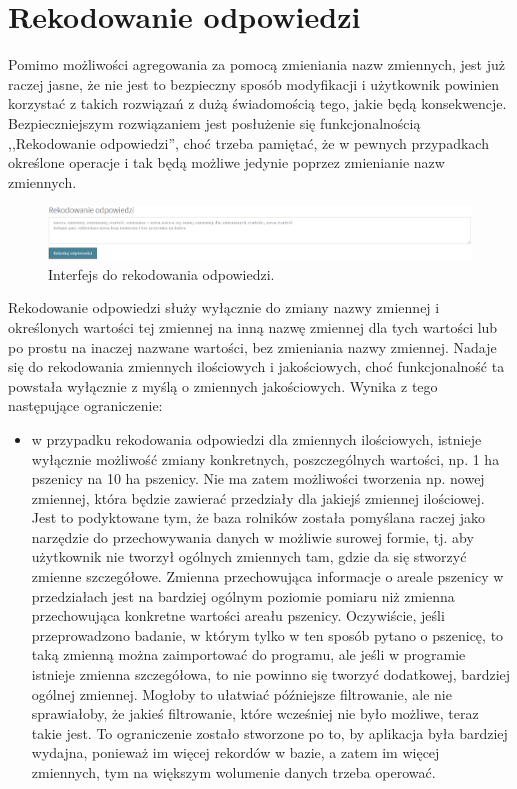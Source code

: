 \documentclass[12pt, twoside, hidelinks]{report}
\begin{document}
\section{Rekodowanie odpowiedzi}
Pomimo możliwości agregowania za pomocą zmieniania nazw zmiennych, jest już raczej jasne, że nie jest to bezpieczny sposób modyfikacji i użytkownik powinien korzystać z takich rozwiązań z dużą świadomością tego, jakie będą konsekwencje. Bezpieczniejszym rozwiązaniem jest posłużenie się funkcjonalnością ,,Rekodowanie odpowiedzi'', choć trzeba pamiętać, że w pewnych przypadkach określone operacje i tak będą możliwe jedynie poprzez zmienianie nazw zmiennych. \par
\begin{figure}[h!]
\includegraphics[width = 1\textwidth]{3.3.}
\caption{Interfejs do rekodowania odpowiedzi.}
\label{rekodowanie_odpowiedzi_interfejs}
\end{figure}
Rekodowanie odpowiedzi służy wyłącznie do zmiany nazwy zmiennej i określonych wartości tej zmiennej na inną nazwę zmiennej dla tych wartości lub po prostu na inaczej nazwane wartości, bez zmieniania nazwy zmiennej. Nadaje się do rekodowania zmiennych ilościowych i jakościowych, choć funkcjonalność ta powstała wyłącznie z myślą o zmiennych jakościowych. Wynika z tego następujące ograniczenie:
\begin{itemize}
\item w przypadku rekodowania odpowiedzi dla zmiennych ilościowych, istnieje wyłącznie możliwość zmiany konkretnych, poszczególnych wartości, np. 1 ha pszenicy na 10 ha pszenicy. Nie ma zatem możliwości tworzenia np. nowej zmiennej, która będzie zawierać przedziały dla jakiejś zmiennej ilościowej. Jest to podyktowane tym, że baza rolników została pomyślana raczej jako narzędzie do przechowywania danych w możliwie surowej formie, tj. aby użytkownik nie tworzył ogólnych zmiennych tam, gdzie da się stworzyć zmienne szczegółowe. Zmienna przechowująca informacje o areale pszenicy w przedziałach jest na bardziej ogólnym poziomie pomiaru niż zmienna przechowująca konkretne wartości areału pszenicy. Oczywiście, jeśli przeprowadzono badanie, w którym tylko w ten sposób pytano o pszenicę, to taką zmienną można zaimportować do programu, ale jeśli w programie istnieje zmienna szczegółowa, to nie powinno się tworzyć dodatkowej, bardziej ogólnej zmiennej. Mogłoby to ułatwiać późniejsze filtrowanie, ale nie sprawiałoby, że jakieś filtrowanie, które wcześniej nie było możliwe, teraz takie jest. To ograniczenie zostało stworzone po to, by aplikacja była bardziej wydajna, ponieważ im więcej rekordów w bazie, a zatem im więcej zmiennych, tym na większym wolumenie danych trzeba operować.
\end{itemize}
\end{document}
